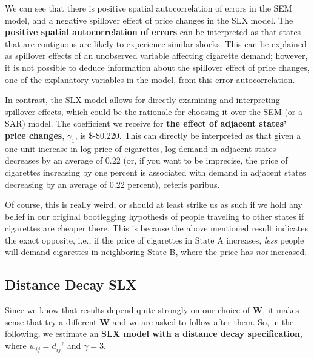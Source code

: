 \documentclass[
  a4paper,
]{article}
\begin{document}
We can see that there is positive spatial autocorrelation of errors in
the SEM model, and a negative spillover effect of price changes in the
SLX model. The \textbf{positive spatial autocorrelation of errors} can
be interpreted as that states that are contiguous are likely to
experience similar shocks. This can be explained as spillover effects of
an unobserved variable affecting cigarette demand; however, it is not
possible to deduce information about the spillover effect of price
changes, one of the explanatory variables in the model, from this error
autocorrelation.

In contrast, the SLX model allows for directly examining and
interpreting spillover effects, which could be the rationale for
choosing it over the SEM (or a SAR) model. The coefficient we receive
for \textbf{the effect of adjacent states' price changes}, \(\gamma_1\),
is \$-\$0.220. This can directly be interpreted as that given a one-unit
increase in log price of cigarettes, log demand in adjacent states
decreases by an average of 0.22 (or, if you want to be imprecise, the
price of cigarettes increasing by one percent is associated with demand
in adjacent states decreasing by an average of 0.22 percent), ceteris
paribus.

Of course, this is really weird, or should at least strike us as such if
we hold any belief in our original bootlegging hypothesis of people
traveling to other states if cigarettes are cheaper there. This is
because the above mentioned result indicates the exact opposite, i.e.,
if the price of cigarettes in State A increases, \emph{less} people will
demand cigarettes in neighboring State B, where the price has \emph{not}
increased.

\hypertarget{distance-decay-slx}{%
\subsection{Distance Decay SLX}\label{distance-decay-slx}}

Since we know that results depend quite strongly on our choice of
\(\bm{W}\), it makes sense that \textcite{halleckvega2015} try a
different \(\bm{W}\) and we are asked to follow after them. So, in the
following, we estimate an \textbf{SLX model with a distance decay
specification}, where \(w_{ij} = d_{ij}^{-\gamma}\) and \(\gamma = 3\).
\end{document}
